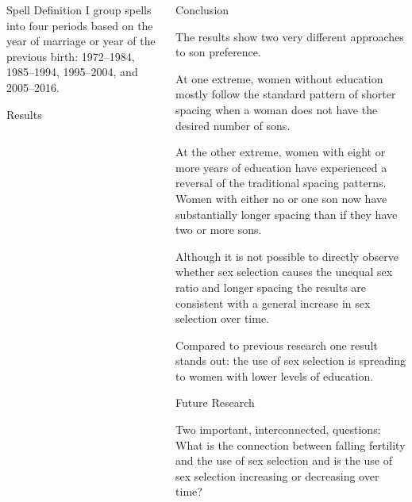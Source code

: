 \documentclass[final]{beamer}
\begin{document}
\begin{frame}{}
\begin{columns}[t]
\begin{column}{.3\linewidth}
\begin{block}{Spell Definition}
I group spells into four periods based on the year of marriage
or year of the previous birth:
1972--1984, 1985--1994, 1995--2004, and 2005--2016.

\end{block}

\begin{block}{Results}

\end{block}


\end{column}


\begin{column}{.3\linewidth}

\begin{block}{Conclusion}


The results show two very different approaches to son preference.

\bigskip

At one extreme, women without education mostly follow the standard 
pattern of shorter spacing when a woman does not have the desired number of 
sons.

\bigskip

At the other extreme, women with eight or more years of education have
experienced a reversal of the traditional spacing patterns.
Women with either no or one son now have substantially longer spacing 
than if they have two or more sons.

\bigskip

Although it is not possible to directly observe whether sex selection
causes the unequal sex ratio and longer spacing the results are
consistent with a general increase in sex selection over time. 

\bigskip

Compared to previous research one result stands out: 
the use of sex selection is spreading to women with lower levels of education.



\end{block}

\begin{block}{Future Research}

Two important, interconnected, questions:
What is the connection between falling fertility and the 
use of sex selection and is the use of sex selection increasing 
or decreasing over time?

\bigskip


\end{block}
\end{column}
\end{columns}
\end{frame}
\end{document}
